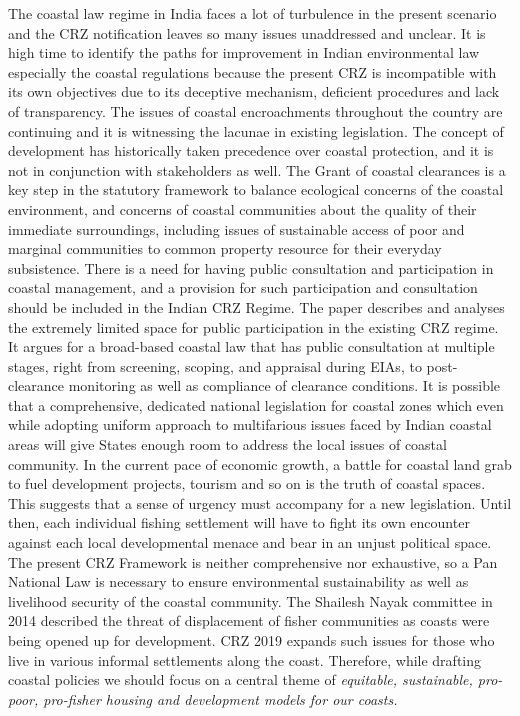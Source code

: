 \begin{multicols}{2}
\noi
The coastal law regime in India faces a lot of turbulence in the present scenario and the CRZ
notification leaves so many issues unaddressed and unclear. It is high time to identify the
paths for improvement in Indian environmental law especially the coastal regulations because
the present CRZ is incompatible with its own objectives due to its deceptive mechanism,
deficient procedures and lack of transparency. The issues of coastal encroachments
throughout the country are continuing and it is witnessing the lacunae in existing legislation.
The concept of development has historically taken precedence over coastal protection, and it
is not in conjunction with stakeholders as well. The Grant of coastal clearances is a key step
in the statutory framework to balance ecological concerns of the coastal environment, and
concerns of coastal communities about the quality of their immediate surroundings, including
issues of sustainable access of poor and marginal communities to common property resource
for their everyday subsistence. There is a need for having public consultation and
participation in coastal management, and a provision for such participation and consultation
should be included in the Indian CRZ Regime. The paper describes and analyses the
extremely limited space for public participation in the existing CRZ regime. It argues for a
broad-based coastal law that has public consultation at multiple stages, right from screening, 
scoping, and appraisal during EIAs, to post-clearance monitoring as well as compliance of
clearance conditions. It is possible that a comprehensive, dedicated national legislation for
coastal zones which even while adopting uniform approach to multifarious issues faced by
Indian coastal areas will give States enough room to address the local issues of coastal
community. In the current pace of economic growth, a battle for coastal land grab to fuel
development projects, tourism and so on is the truth of coastal spaces. This suggests that a
sense of urgency must accompany for a new legislation. Until then, each individual fishing
settlement will have to fight its own encounter against each local developmental menace and
bear in an unjust political space. The present CRZ Framework is neither comprehensive nor
exhaustive, so a Pan National Law is necessary to ensure environmental sustainability as well
as livelihood security of the coastal community. The Shailesh Nayak committee in 2014
described the threat of displacement of fisher communities as coasts were being opened
up for development. CRZ 2019 expands such issues for those who live in various
informal settlements along the coast. Therefore, while drafting coastal policies we
should focus on a central theme of \textit{equitable, sustainable, pro-poor, pro-fisher housing
and development models for our coasts.}

\end{multicols}
